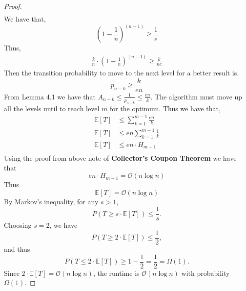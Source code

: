 \documentclass[a4paper, 12pt]{article}
\begin{document}
\begin{proof}
\begin{align*}
        \end{align*}
        We have that,
        \begin{equation*}
            \left(1-\frac{1}{n}\right)^{(n-1)}\geq\frac{1}{e}
        \end{equation*}
        Thus,
        \begin{align*}
            \frac{k}{n}\cdot\left(1 - \frac{1}{n}\right)^{(n-1)}\geq\frac{k}{ne}
        \end{align*}
        Then the transition probability to move to the next level for a better result is.
        \begin{equation*}
            p_{n-k} \geq \frac{k}{en}
        \end{equation*} 
        From Lemma 4.1\cite[p.45]{NeumannWitt2010} we have that $A_{n-k}\leq\frac{1}{p_{n-k}}\leq\frac{en}{k}$. The algorithm must move up all the levels
        until to reach level $m$ for the optimum. Thus we have that,
        \begin{align*}
            \mathbb{E}[T]&\leq\sum_{k=1}^{m-1}\frac{en}{k}\\
            \mathbb{E}[T]&\leq en\sum_{k=1}^{m-1}\frac{1}{k}\\
            \mathbb{E}[T]&\leq en\cdot H_{m-1}\\
        \end{align*}
        Using the proof from above note of \textbf{Collector's Coupon Theorem} we have that
        \begin{equation*}
            en\cdot H_{m-1} = \mathcal{O}(n\log n)
        \end{equation*}
        Thus
        \begin{equation*}
            \mathbb{E}[T]=\mathcal{O}(n\log n)
        \end{equation*}
        By Markov's inequality, for any $s > 1$,
        \begin{equation*}
            P(T \geq s \cdot \mathbb{E}[T]) \leq \frac{1}{s}.
        \end{equation*}
        Choosing $s = 2$, we have
        \begin{equation*}
            P(T \geq 2 \cdot \mathbb{E}[T]) \leq \frac{1}{2},
        \end{equation*}
        and thus
        \begin{equation*}
            P(T \leq 2 \cdot \mathbb{E}[T]) \geq 1 - \frac{1}{2} = \frac{1}{2} = \Omega(1).
        \end{equation*}
        Since $2 \cdot \mathbb{E}[T] = \mathcal{O}(n \log n)$, the runtime is $\mathcal{O}(n \log n)$ with probability $\Omega(1)$.
    \end{proof}
\newpage
\printbibliography
\end{document}
